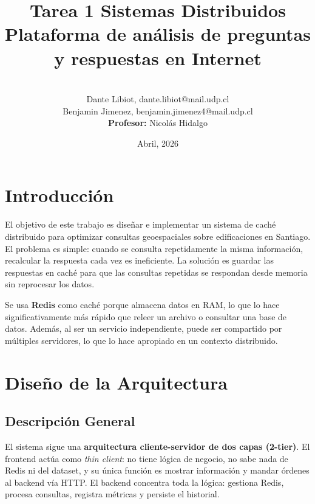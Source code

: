 \documentclass[letter,12pt]{article}
\begin{document}
\title{\Huge{Tarea 1 Sistemas Distribuidos} \\
  \large Plataforma de análisis de preguntas y respuestas en Internet}
\author{\\Dante Libiot, dante.libiot@mail.udp.cl\\ Benjamin Jimenez, benjamin.jimenez4@mail.udp.cl \\ \textbf{Profesor: } Nicolás Hidalgo}
\date{Abril, 2026}
\maketitle
\tableofcontents
\newpage
\section{Introducción}
El objetivo de este trabajo es diseñar e implementar un sistema de caché distribuido para
optimizar consultas geoespaciales sobre edificaciones en Santiago. El problema es simple:
cuando se consulta repetidamente la misma información, recalcular la respuesta cada vez
es ineficiente. La solución es guardar las respuestas en caché para que las consultas
repetidas se respondan desde memoria sin reprocesar los datos.

Se usa \textbf{Redis} como caché porque almacena datos en RAM, lo que lo hace
significativamente más rápido que releer un archivo o consultar una base de datos.
Además, al ser un servicio independiente, puede ser compartido por múltiples servidores,
lo que lo hace apropiado en un contexto distribuido.

\section{Diseño de la Arquitectura}
\subsection{Descripción General}

El sistema sigue una \textbf{arquitectura cliente-servidor de dos capas (2-tier)}.
El frontend actúa como \textit{thin client}: no tiene lógica de negocio, no sabe nada
de Redis ni del dataset, y su única función es mostrar información y mandar órdenes al
backend vía HTTP. El backend concentra toda la lógica: gestiona Redis, procesa consultas,
registra métricas y persiste el historial.
\end{document}
